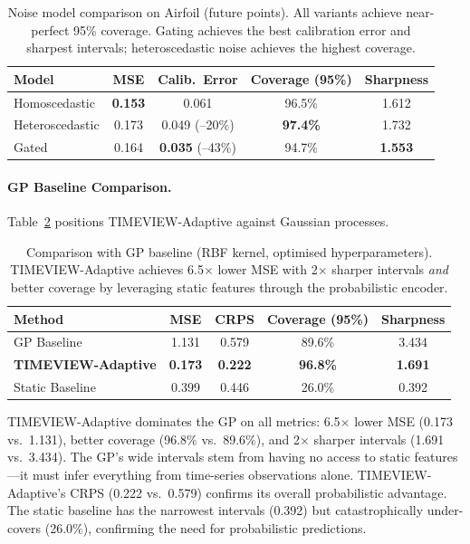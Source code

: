 \documentclass[final]{article}
\begin{document}
\begin{table}[t]
\caption{Noise model comparison on Airfoil (future points). All variants achieve near-perfect 95\% coverage. Gating achieves the best calibration error and sharpest intervals; heteroscedastic noise achieves the highest coverage.}
\label{tab:noise_model}
\centering
\small
\begin{tabular}{lcccc}
\toprule
Model & MSE & Calib.\ Error & Coverage (95\%) & Sharpness \\
\midrule
Homoscedastic & \textbf{0.153} & 0.061 & 96.5\% & 1.612 \\
Heteroscedastic & 0.173 & 0.049 \small{(\textcolor{green!60!black}{--20\%})} & \textbf{97.4\%} & 1.732 \\
Gated & 0.164 & \textbf{0.035} \small{(\textcolor{green!60!black}{--43\%})} & 94.7\% & \textbf{1.553} \\
\bottomrule
\end{tabular}
\end{table}

\paragraph{GP Baseline Comparison.} Table~\ref{tab:gp} positions TIMEVIEW-Adaptive against Gaussian processes.

\begin{table}[t]
\caption{Comparison with GP baseline (RBF kernel, optimised hyperparameters). TIMEVIEW-Adaptive achieves 6.5$\times$ lower MSE with 2$\times$ sharper intervals \emph{and} better coverage by leveraging static features through the probabilistic encoder.}
\label{tab:gp}
\centering
\small
\begin{tabular}{lcccc}
\toprule
Method & MSE & CRPS & Coverage (95\%) & Sharpness \\
\midrule
GP Baseline & 1.131 & 0.579 & 89.6\% & 3.434 \\
\textbf{TIMEVIEW-Adaptive} & \textbf{0.173} & \textbf{0.222} & \textbf{96.8\%} & \textbf{1.691} \\
Static Baseline & 0.399 & 0.446 & 26.0\% & 0.392 \\
\bottomrule
\end{tabular}
\end{table}

TIMEVIEW-Adaptive dominates the GP on all metrics: 6.5$\times$ lower MSE (0.173 vs.\ 1.131), better coverage (96.8\% vs.\ 89.6\%), and 2$\times$ sharper intervals (1.691 vs.\ 3.434). The GP's wide intervals stem from having no access to static features---it must infer everything from time-series observations alone. TIMEVIEW-Adaptive's CRPS (0.222 vs.\ 0.579) confirms its overall probabilistic advantage. The static baseline has the narrowest intervals (0.392) but catastrophically under-covers (26.0\%), confirming the need for probabilistic predictions.
\end{document}
